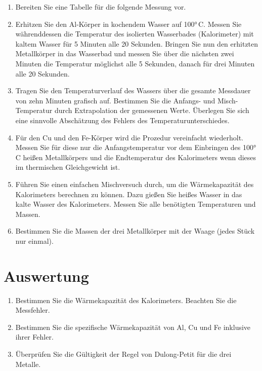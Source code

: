 \begin{enumerate}
 \item Bereiten Sie eine Tabelle für die folgende Messung vor.
 \item Erhitzen Sie den Al-Körper in kochendem Wasser auf 100°\,C. Messen Sie währenddessen die Temperatur des isolierten Wasserbades (Kalorimeter) mit kaltem Wasser für 5 Minuten alle 20 Sekunden. Bringen Sie nun den erhitzten Metallkörper in das Wasserbad und messen Sie über die nächsten zwei Minuten die Temperatur möglichst alle 5 Sekunden, danach für drei Minuten alle 20 Sekunden.
 \item Tragen Sie den Temperaturverlauf des Wassers über die gesamte Messdauer von zehn Minuten grafisch auf. Bestimmen Sie die Anfangs- und Misch-Temperatur durch Extrapolation der gemessenen Werte. Überlegen Sie sich eine sinnvolle Abschätzung des Fehlers des Temperaturunterschiedes.
 \item Für den Cu und den Fe-Körper wird die Prozedur vereinfacht wiederholt. Messen Sie für diese nur die Anfangstemperatur vor dem Einbringen des 100°\,C heißen Metallkörpers und die Endtemperatur des Kalorimeters wenn dieses im thermischen Gleichgewicht ist.
 \item Führen Sie einen einfachen Mischversuch durch, um die Wärmekapazität des Kalorimeters berechnen zu können. Dazu gießen Sie heißes Wasser in das kalte Wasser des Kalorimeters. Messen Sie alle benötigten Temperaturen und Massen.
 \item Bestimmen Sie die Massen der drei Metallkörper mit der Waage (jedes Stück nur einmal).
\end{enumerate}
\section{Auswertung} 

\begin{enumerate}
 \item Bestimmen Sie die Wärmekapazität des Kalorimeters. Beachten Sie die Messfehler.
 \item Bestimmen Sie die spezifische Wärmekapazität von Al, Cu und Fe inklusive ihrer Fehler.
 \item Überprüfen Sie die Gültigkeit der Regel von Dulong-Petit für die drei Metalle.
\end{enumerate}